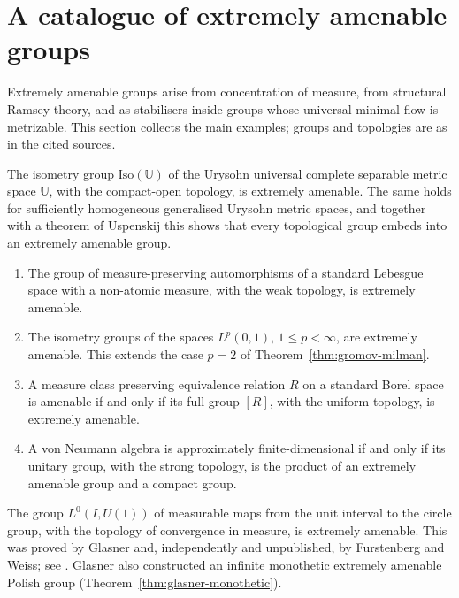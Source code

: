 \section{A catalogue of extremely amenable groups}\label{sec:ea-catalogue}

Extremely amenable groups arise from concentration of measure, from structural
Ramsey theory, and as stabilisers inside groups whose universal minimal flow
is metrizable. This section collects the main examples; groups and
topologies are as in the cited sources.

\begin{theorem}\label{thm:pestov-urysohn}
The isometry group $\mathrm{Iso}(\mathbb{U})$ of the Urysohn universal
complete separable metric space $\mathbb{U}$, with the compact-open topology, is
extremely amenable. The same holds for sufficiently homogeneous generalised
Urysohn metric spaces, and together with a theorem of Uspenskij this shows that
every topological group embeds into an extremely amenable group.
\end{theorem}

\begin{theorem}\label{thm:giordano-pestov}
\begin{enumerate}
\item The group of measure-preserving automorphisms of a standard Lebesgue
  space with a non-atomic measure, with the weak topology, is extremely
  amenable.
\item The isometry groups of the spaces $L^p(0,1)$, $1\leq p<\infty$, are
  extremely amenable. This extends the case $p=2$ of
  Theorem~\ref{thm:gromov-milman}.
\item A measure class preserving equivalence relation $R$ on a standard Borel
  space is amenable if and only if its full group $[R]$, with the uniform
  topology, is extremely amenable.
\item A von Neumann algebra is approximately finite-dimensional if and only if
  its unitary group, with the strong topology, is the product of an extremely
  amenable group and a compact group.
\end{enumerate}
\end{theorem}

\begin{remark}\label{rem:l0}
The group $L^0(I,U(1))$ of measurable maps from the unit interval to the circle
group, with the topology of convergence in measure, is extremely amenable. This
was proved by Glasner and, independently and unpublished, by Furstenberg and
Weiss; see \cite{GiordanoPestov2007}. Glasner also constructed an
infinite monothetic extremely amenable Polish group
(Theorem~\ref{thm:glasner-monothetic}).
\end{remark}

